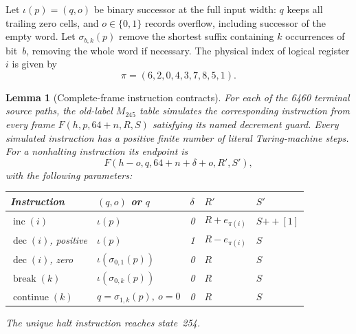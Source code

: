 \documentclass[11pt]{article}
\newtheorem{lemma}{Lemma}
\begin{document}
Let $\iota(p)=(q,o)$ be binary successor at the full input width: $q$ keeps
all trailing zero cells, and $o\in\{0,1\}$ records overflow, including
successor of the empty word. Let $\sigma_{b,k}(p)$ remove the shortest suffix
containing $k$ occurrences of bit~$b$, removing the whole word if necessary.
The physical index of logical register $i$ is given by
\[
 \pi=(6,2,0,4,3,7,8,5,1).
\]

\begin{lemma}[Complete-frame instruction contracts]
For each of the 6460 terminal source paths, the old-label $M_{245}$ table
simulates the corresponding instruction from every frame
$F(h,p,64+n,R,S)$ satisfying its named decrement guard. Every simulated
instruction has a positive finite number of literal Turing-machine steps.
For a nonhalting instruction its endpoint is
\[
 F(h-o,q,64+n+\delta+o,R',S'),
\]
with the following parameters:
\begin{center}
\begin{tabular}{@{}lllll@{}}
\toprule
Instruction & $(q,o)$ or $q$ & $\delta$ & $R'$ & $S'$\\
\midrule
$\operatorname{inc}(i)$ & $\iota(p)$ & 0 & $R+e_{\pi(i)}$ & $S\mathbin{+\!+}[1]$\\
$\operatorname{dec}(i)$, positive & $\iota(p)$ & 1 & $R-e_{\pi(i)}$ & $S$\\
$\operatorname{dec}(i)$, zero & $\iota(\sigma_{0,1}(p))$ & 0 & $R$ & $S$\\
$\operatorname{break}(k)$ & $\iota(\sigma_{0,k}(p))$ & 0 & $R$ & $S$\\
$\operatorname{continue}(k)$ & $q=\sigma_{1,k}(p),\ o=0$ & 0 & $R$ & $S$\\
\bottomrule
\end{tabular}
\end{center}
The unique halt instruction reaches state~254.
\end{lemma}
\end{document}
